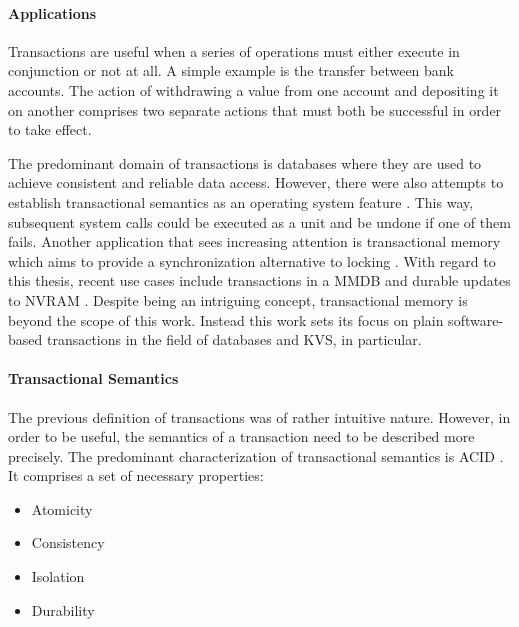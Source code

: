 \paragraph{Applications}

Transactions are useful when a series of operations must either execute in
conjunction or not at all. A simple example is the transfer between bank
accounts. The action of withdrawing a value from one account and depositing it
on another comprises two separate actions that must both be successful in order
to take effect.

The predominant domain of transactions is databases where they are used to
achieve consistent and reliable data access. However, there were also attempts
to establish transactional semantics as an operating system feature
\cite{porter2009operating, spinellis2009user, black1991understanding}. This way,
subsequent system calls could be executed as a unit and be undone if one of them
fails. Another application that sees increasing attention is transactional
memory which aims to provide a synchronization alternative to locking
\cite{knight1986architecture, herlihy1993transactional, shavit1997software}.
With regard to this thesis, recent use cases include transactions in a MMDB
\cite{leis2014exploiting} and durable updates to NVRAM
\cite{volos2011mnemosyne}. Despite being an intriguing concept, transactional
memory is beyond the scope of this work. Instead this work sets its focus on
plain software-based transactions in the field of databases and KVS, in
particular.

\paragraph{Transactional Semantics}

The previous definition of transactions was of rather intuitive nature. However,
in order to be useful, the semantics of a transaction need to be described more
precisely. The predominant characterization of transactional semantics is ACID
\cite{gray1981transaction, haerder1983principles}. It comprises a set of necessary properties:

\begin{itemize}
    \item Atomicity
    \item Consistency
    \item Isolation
    \item Durability
\end{itemize}

